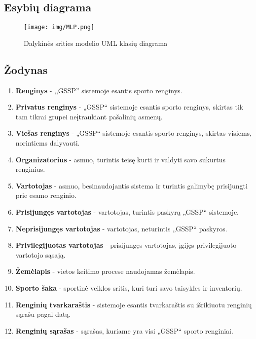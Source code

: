 \documentclass{VUMIFPSkursinis}
\begin{document}
        \subsection{Esybių diagrama} \label{strukturinisDSModelis_esybiuDiagrama}
            \begin{figure}[H]
                \centering
                \texttt{[image: img/MLP.png]}
                \caption{Dalykinės srities modelio UML klasių diagrama}
                \label{fig:DS-klasiu-diagrama}
            \end{figure}
        \subsection*{Žodynas} \label{strukturinisDSModelis_zodynas}
            \begin{enumerate}[label=\textbf{E\arabic*.}]
                \item \textbf{Renginys} - ,,GSSP'' sistemoje esantis sporto renginys.
				\item \textbf{Privatus renginys} - „GSSP“ sistemoje esantis sporto renginys, skirtas tik tam tikrai grupei neįtraukiant pašalinių asmenų.
				\item \textbf{Viešas renginys} - „GSSP“ sistemoje esantis sporto renginys, skirtas visiems, norintiems dalyvauti.
                \item \textbf{Organizatorius} - asmuo, turintis teisę kurti ir valdyti savo sukurtus renginius.
                \item \textbf{Vartotojas} - asmuo, besinaudojantis sistema ir turintis galimybę prisijungti prie 
				esamo renginio.
				\item \textbf{Prisijungęs vartotojas} - vartotojas, turintis paskyrą „GSSP“ sistemoje.
				\item \textbf{Neprisijungęs vartotojas} - vartotojas, neturintis „GSSP“ paskyros.
				\item \textbf{Privilegijuotas vartotojas} - prisijungęs vartotojas, įgijęs privilegijuoto vartotojo sąsają.
                \item \textbf{Žemėlapis} - vietos keitimo procese naudojamas žemėlapis.
				\item \textbf{Sporto šaka} - sportinė veiklos sritis, kuri turi savo taisykles ir inventorių.
				\item \textbf{Renginių tvarkaraštis} - sistemoje esantis tvarkaraštis su išrikiuotu renginių sąrašu pagal datą.
				\item \textbf{Renginių sąrašas} - sąrašas, kuriame yra visi „GSSP“ sporto renginiai.

\end{enumerate}
\end{document}
